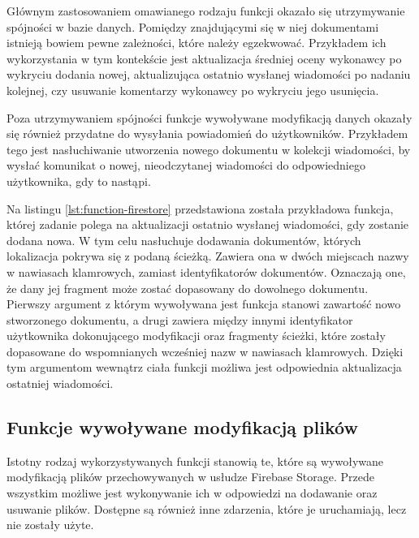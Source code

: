 Głównym zastosowaniem omawianego rodzaju funkcji okazało się utrzymywanie spójności w bazie danych. Pomiędzy znajdującymi się w niej dokumentami istnieją bowiem pewne zależności, które należy egzekwować. Przykładem ich wykorzystania w tym kontekście jest aktualizacja średniej oceny wykonawcy po wykryciu dodania nowej, aktualizująca ostatnio wysłanej wiadomości po nadaniu kolejnej, czy usuwanie komentarzy wykonawcy po wykryciu jego usunięcia.

Poza utrzymywaniem spójności funkcje wywoływane modyfikacją danych okazały się również przydatne do wysyłania powiadomień do użytkowników. Przykładem tego jest nasłuchiwanie utworzenia nowego dokumentu w kolekcji wiadomości, by wysłać komunikat o nowej, nieodczytanej wiadomości do odpowiedniego użytkownika, gdy to nastąpi.

Na listingu \ref{lst:function-firestore} przedstawiona została przykładowa funkcja, której zadanie polega na aktualizacji ostatnio wysłanej wiadomości, gdy zostanie dodana nowa. W tym celu nasłuchuje dodawania dokumentów, których lokalizacja pokrywa się z podaną ścieżką. Zawiera ona w dwóch miejscach nazwy w nawiasach klamrowych, zamiast identyfikatorów dokumentów. Oznaczają one, że dany jej fragment może zostać dopasowany do dowolnego dokumentu. Pierwszy argument z którym wywoływana jest funkcja stanowi zawartość nowo stworzonego dokumentu, a drugi zawiera między innymi identyfikator użytkownika dokonującego modyfikacji oraz fragmenty ścieżki, które zostały dopasowane do wspomnianych wcześniej nazw w nawiasach klamrowych. Dzięki tym argumentom wewnątrz ciała funkcji możliwa jest odpowiednia aktualizacja ostatniej wiadomości.

\begin{minipage}{\linewidth}

\end{minipage}

\subsection{Funkcje wywoływane modyfikacją plików}

Istotny rodzaj wykorzystywanych funkcji stanowią te, które są wywoływane modyfikacją plików przechowywanych w usłudze Firebase Storage. Przede wszystkim możliwe jest wykonywanie ich w odpowiedzi na dodawanie oraz usuwanie plików. Dostępne są również inne zdarzenia, które je uruchamiają, lecz nie zostały użyte.

